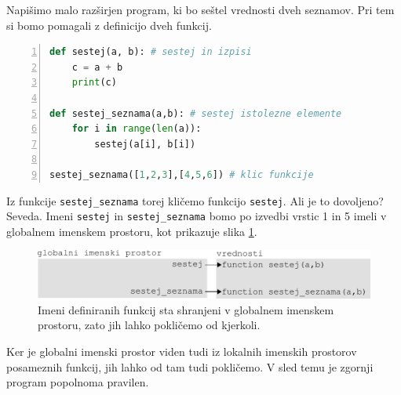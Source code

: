 Napišimo malo razširjen program, ki bo seštel vrednosti dveh seznamov. Pri tem si bomo pomagali z definicijo dveh funkcij.
\begin{lstlisting}[language=Python, showstringspaces=false,numbers=left]
def sestej(a, b): # sestej in izpisi
    c = a + b
    print(c)

def sestej_seznama(a,b): # sestej istolezne elemente
    for i in range(len(a)):
        sestej(a[i], b[i])

sestej_seznama([1,2,3],[4,5,6]) # klic funkcije
\end{lstlisting}
Iz funkcije \texttt{sestej\_seznama} torej kličemo funkcijo \texttt{sestej}. Ali je to dovoljeno? Seveda. Imeni \texttt{sestej} in \texttt{sestej\_seznama} bomo po izvedbi vrstic 1 in 5 imeli v globalnem imenskem prostoru, kot prikazuje slika  \ref{img:imenski_prostor_7}.
\begin{figure}
    \centering
    \includegraphics[width=\linewidth]{img/imenski_prostor_7.pdf}
    \caption{Imeni definiranih funkcij sta shranjeni v globalnem imenskem prostoru, zato jih lahko pokličemo od kjerkoli.}
    \label{img:imenski_prostor_7}
\end{figure}

Ker je globalni imenski prostor viden tudi iz lokalnih imenskih prostorov posameznih funkcij, jih lahko od tam tudi pokličemo. V sled temu je zgornji program popolnoma pravilen. 


